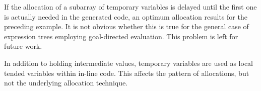 If the allocation of a subarray of temporary variables is delayed
until the first one is actually needed in the generated code, an
optimum allocation results for the preceding example. It is not
obvious whether this is true for the general case of expression trees
employing goal-directed evaluation. This problem is left for future
work.

In addition to holding intermediate values, temporary variables are
used as local tended variables within in-line code.  This affects the
pattern of allocations, but not the underlying allocation technique.
